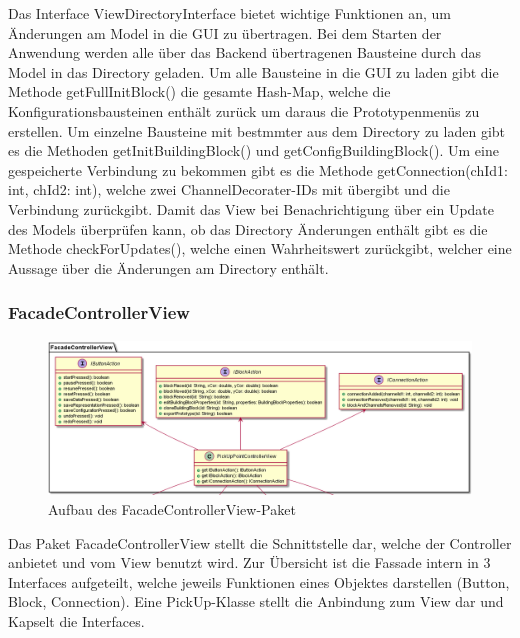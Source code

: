 \documentclass[parskip=full]{scrartcl}
\begin{document}
Das Interface ViewDirectoryInterface bietet wichtige Funktionen an, um Änderungen am Model in die GUI zu übertragen. 
Bei dem Starten der Anwendung werden alle über das Backend übertragenen Bausteine durch das Model in das Directory geladen. Um alle Bausteine in die GUI zu laden gibt die Methode getFullInitBlock() die gesamte Hash-Map, welche die Konfigurationsbausteinen enthält zurück um daraus die Prototypenmenüs zu erstellen. Um einzelne Bausteine mit bestmmter aus dem Directory zu laden gibt es die Methoden getInitBuildingBlock() und getConfigBuildingBlock(). Um eine gespeicherte Verbindung zu bekommen gibt es die Methode getConnection(chId1: int, chId2: int), welche zwei ChannelDecorater-IDs mit übergibt und die Verbindung zurückgibt.
Damit das View bei Benachrichtigung über ein Update des Models überprüfen kann, ob das Directory Änderungen enthält gibt es die Methode checkForUpdates(), welche einen Wahrheitswert zurückgibt, welcher eine Aussage über die Änderungen am Directory enthält.

\clearpage

\subsubsection{FacadeControllerView}

\begin{figure}[htbp]
	\begin{center}
		\includegraphics[width = 14 cm]{Grafiken/View/FacadeControllerViewNamespace.png}
		\caption{Aufbau des FacadeControllerView-Paket}
		\label{Entwurf_Grob}
	\end{center}
\end{figure}

Das Paket FacadeControllerView stellt die Schnittstelle dar, welche der Controller anbietet und vom View benutzt wird. Zur Übersicht ist die Fassade intern in 3 Interfaces aufgeteilt, welche jeweils Funktionen eines Objektes darstellen (Button, Block, Connection). Eine PickUp-Klasse stellt die Anbindung zum View dar und Kapselt die Interfaces.
\end{document}
